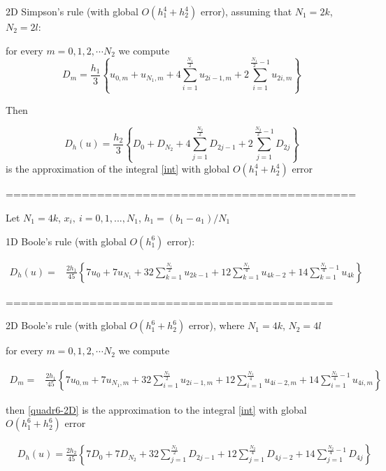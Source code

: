 \documentclass{article}
\begin{document}
2D Simpson's rule (with global $O(h_1^4+h_2^4)$ error), assuming that $N_1=2k$, $N_2=2 l$:

for every $m=0,1,2,\cdots N_2$ we compute 
$$D_m= \frac{h_1 }{3} 
\left\{ u_{0,m}+u_{N_1,m}+ 4 \sum_{i=1}^{\frac{N_1}{2}}   u_{2i-1,m}
 +2 \sum_{i=1}^{\frac{N_1}{2}-1} u_{2i,m} \right\}$$


Then 

\begin{equation}\label{quadr4}
D_h(u)=\frac{h_2 }{3} 
\left\{ D_{0}+D_{N_2}+ 4 \sum_{j=1}^{\frac{N_2}{2}}   D_{2j-1}
 +2 \sum_{j=1}^{{\frac{N_2}{2}}-1} D_{2j} \right\}
\end{equation}
is the approximation of the integral \eqref{int} with global $O(h_1^4+h_2^4)$ error

%
==============================================

Let $N_1=4k$, $x_i, ~i=0,1,...,N_1$, $h_1=(b_1-a_1)/N_1$ 

1D Boole's rule (with global $O(h_1^6)$ error):

\begin{align}\label{quadr6-1D}
D_h(u) =& \frac{2h_1}{45} 
\left\{
7u_0+7u_{N_1}+32 \sum_{k=1}^{{\frac{N_1}{2}}}u_{2k-1}
+12\sum_{k=1}^{{\frac{N_1}{4}}}u_{4k-2}
+14 \sum_{k=1}^{\frac{N_1}{4}-1}u_{4k}
\right\}
\end{align}

===========================================

2D Boole's rule (with global $O(h_1^6+h_2^6)$ error), where $N_1=4k$, $N_2=4 l$

for every $m=0,1,2,\cdots N_2$ we compute

\begin{align*}
D_m =& \frac{2h_1}{45} 
\left\{
7u_{0,m}+7u_{N_1,m}+32 \sum_{i=1}^{\frac{N_1}{2}}u_{2i-1,m}
+12\sum_{i=1}^{\frac{N_1}{4}}u_{4i-2,m}
+14 \sum_{i=1}^{\frac{N_1}{4}-1}u_{4i,m}
\right\}
\end{align*}


then \eqref{quadr6-2D} is the approximation to the integral \eqref{int} with global $O(h_1^6+h_2^6)$ error



\begin{align}\label{quadr6-2D}
&D_h(u) =
\frac{2h_2}{45} 
\left\{
7D_{0}+7D_{N_2}+32 \sum_{j=1}^{\frac{N_2}{2}}D_{2j-1}
+12\sum_{j=1}^{\frac{N_2}{4}}D_{4j-2}
+14 \sum_{j=1}^{\frac{N_2}{4}-1}D_{4j}
\right\}
\end{align}
\end{document}
